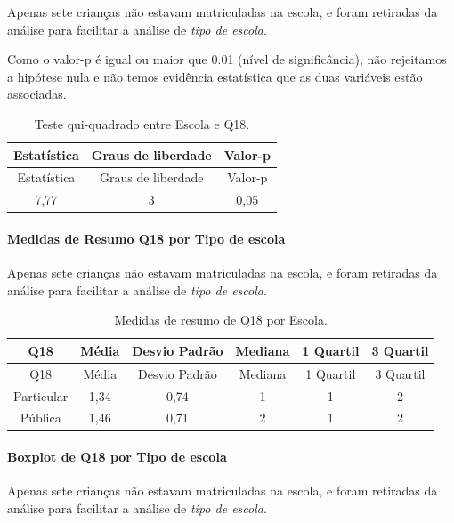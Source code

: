 \documentclass[]{article}
\let\oldparagraph\paragraph
\renewcommand{\paragraph}[1]{\oldparagraph{#1}\mbox{}}
\begin{document}
Apenas sete crianças não estavam matriculadas na escola, e foram retiradas da análise para facilitar a análise de \emph{tipo de escola}.

Como o valor-p é igual ou maior que 0.01 (nível de significância), não rejeitamos a hipótese nula e não temos evidência estatística que as duas variáveis estão associadas.

\begin{longtable}[]{@{}ccc@{}}
\caption{\label{tab:unnamed-chunk-292}Teste qui-quadrado entre Escola e Q18.}\tabularnewline
\toprule
Estatística & Graus de liberdade & Valor-p\tabularnewline
\midrule
\endfirsthead
\toprule
Estatística & Graus de liberdade & Valor-p\tabularnewline
\midrule
\endhead
7,77 & 3 & 0,05\tabularnewline
\bottomrule
\end{longtable}

\cleardoublepage

\hypertarget{medidas-de-resumo-q18-por-tipo-de-escola}{%
\paragraph{Medidas de Resumo Q18 por Tipo de escola}\label{medidas-de-resumo-q18-por-tipo-de-escola}}

Apenas sete crianças não estavam matriculadas na escola, e foram retiradas da análise para facilitar a análise de \emph{tipo de escola}.

\begin{longtable}[]{@{}cccccc@{}}
\caption{\label{tab:unnamed-chunk-293}Medidas de resumo de Q18 por Escola.}\tabularnewline
\toprule
Q18 & Média & Desvio Padrão & Mediana & 1 Quartil & 3 Quartil\tabularnewline
\midrule
\endfirsthead
\toprule
Q18 & Média & Desvio Padrão & Mediana & 1 Quartil & 3 Quartil\tabularnewline
\midrule
\endhead
Particular & 1,34 & 0,74 & 1 & 1 & 2\tabularnewline
Pública & 1,46 & 0,71 & 2 & 1 & 2\tabularnewline
\bottomrule
\end{longtable}

\hypertarget{boxplot-de-q18-por-tipo-de-escola}{%
\paragraph{Boxplot de Q18 por Tipo de escola}\label{boxplot-de-q18-por-tipo-de-escola}}

Apenas sete crianças não estavam matriculadas na escola, e foram retiradas da análise para facilitar a análise de \emph{tipo de escola}.
\end{document}
